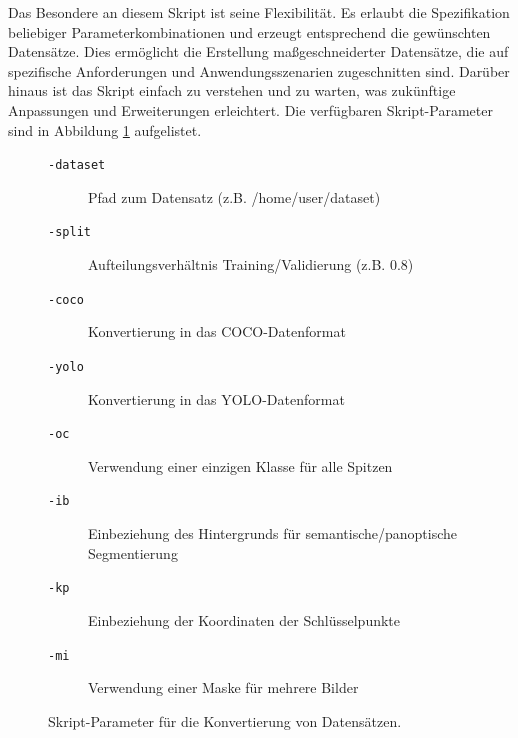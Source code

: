 Das Besondere an diesem Skript ist seine Flexibilität. Es erlaubt die Spezifikation beliebiger Parameterkombinationen und erzeugt entsprechend die gewünschten Datensätze. Dies ermöglicht die Erstellung maßgeschneiderter Datensätze, die auf spezifische Anforderungen und Anwendungsszenarien zugeschnitten sind. Darüber hinaus ist das Skript einfach zu verstehen und zu warten, was zukünftige Anpassungen und Erweiterungen erleichtert.
Die verfügbaren Skript-Parameter sind in Abbildung \ref{fig:param} aufgelistet.
\begin{figure}
    \centering
\begin{center}
\begin{description}
\item[\texttt{-dataset}] Pfad zum Datensatz (z.B. /home/user/dataset)
\item[\texttt{-split}] Aufteilungsverhältnis Training/Validierung (z.B. 0.8)
\item[\texttt{-coco}] Konvertierung in das COCO-Datenformat
\item[\texttt{-yolo}] Konvertierung in das YOLO-Datenformat
\item[\texttt{-oc}] Verwendung einer einzigen Klasse für alle Spitzen
\item[\texttt{-ib}] Einbeziehung des Hintergrunds für semantische/panoptische Segmentierung
\item[\texttt{-kp}] Einbeziehung der Koordinaten der Schlüsselpunkte
\item[\texttt{-mi}] Verwendung einer Maske für mehrere Bilder
\end{description}
\end{center}
    \caption{Skript-Parameter für die Konvertierung von Datensätzen.}
    \label{fig:param}
\end{figure}
